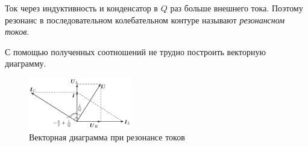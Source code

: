 Ток через индуктивность и конденсатор в $Q$ раз больше внешнего тока. Поэтому резонанс в последовательном колебательном контуре называют \textit{резонансном токов}.

С помощью полученных соотношений не трудно построить векторную диаграмму.

\begin{figure}[H]
	\vspace{-10pt}
	\centering
	\includegraphics[width=0.4\textwidth]{../res/vect_diagram.png}
	\caption{Векторная диаграмма при резонансе токов}
	\label{fig:vect_diagram}
\end{figure}